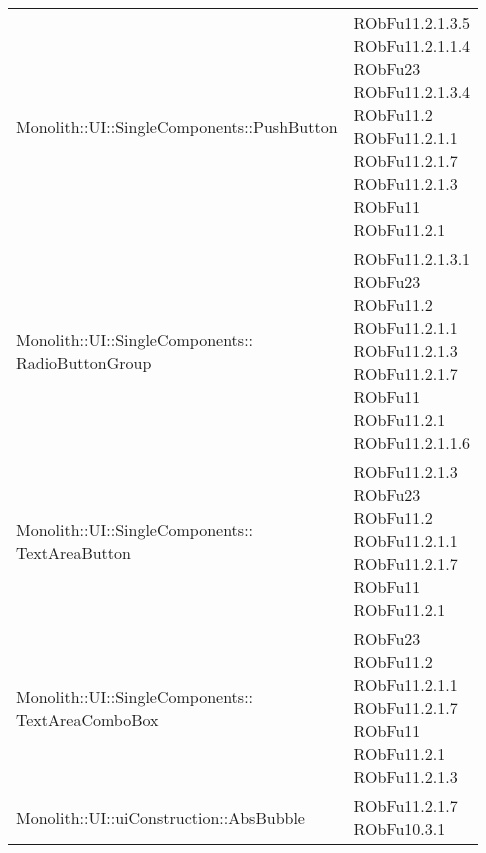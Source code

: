 \begin{center}
\begin{longtable}{|
*{1}{>{\centering\arraybackslash}m{7.5cm}|}
*{1}{>{\centering\arraybackslash}m{2.5cm}|}}
{\\}\\\hline
Monolith::UI::SingleComponents::PushButton & \makecell{RObFu11.2.1.3.5
\\RObFu11.2.1.1.4
\\RObFu23
\\RObFu11.2.1.3.4
\\RObFu11.2
\\RObFu11.2.1.1
\\RObFu11.2.1.7
\\RObFu11.2.1.3
\\RObFu11
\\RObFu11.2.1
\\}\\\hline
\makecell[l]{Monolith::UI::SingleComponents:: \\ \hfill RadioButtonGroup} & \makecell{RObFu11.2.1.3.1
\\RObFu23
\\RObFu11.2
\\RObFu11.2.1.1
\\RObFu11.2.1.3
\\RObFu11.2.1.7
\\RObFu11
\\RObFu11.2.1
\\RObFu11.2.1.1.6
\\}\\\hline
\makecell[l]{Monolith::UI::SingleComponents:: \\ \hfill TextAreaButton} & \makecell{RObFu11.2.1.3
\\RObFu23
\\RObFu11.2
\\RObFu11.2.1.1
\\RObFu11.2.1.7
\\RObFu11
\\RObFu11.2.1
\\}\\\hline
\makecell[l]{Monolith::UI::SingleComponents:: \\ \hfill TextAreaComboBox} & \makecell{RObFu23
\\RObFu11.2
\\RObFu11.2.1.1
\\RObFu11.2.1.7
\\RObFu11
\\RObFu11.2.1
\\RObFu11.2.1.3
\\}\\\hline
Monolith::UI::uiConstruction::AbsBubble & \makecell{RObFu11.2.1.7
\\RObFu10.3.1
}
\end{longtable}
\end{center}
